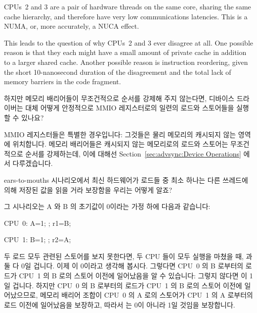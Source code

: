 \begin{enumerate}
	CPUs~2 and 3 are a pair of hardware threads on the same
	core, sharing the same cache hierarchy, and therefore have
	very low communications latencies.
	This is a NUMA, or, more accurately, a NUCA effect.

	This leads to the question of why CPUs~2 and 3 ever disagree
	at all.
	One possible reason is that they each might have a small amount
	of private cache in addition to a larger shared cache.
	Another possible reason is instruction reordering, given the
	short 10-nanosecond duration of the disagreement and the
	total lack of memory barriers in the code fragment.
	\fi

\QuickQ{}
	하지만 메모리 배리어들이 무조건적으로 순서를 강제해 주지 않는다면,
	디바이스 드라이버는 대체 어떻게 안정적으로 MMIO 레지스터로의 일련의
	로드와 스토어들을 실행할 수 있나요?

\QuickA{}
	MMIO 레지스터들은 특별한 경우입니다: 그것들은 물리 메모리의 캐시되지
	않는 영역에 위치합니다.
	메모리 배리어들은 캐시되지 않는 메모리로의 로드와 스토어는 무조건적으로
	순서를 강제하는데, 이에 대해선 Section~\ref{sec:advsync:Device
	Operations} 에서 다루겠습니다.

\QuickQ{}
	ears-to-mouths 시나리오에서 최신 하드웨어가 로드들 중 최소 하나는 다른
	쓰레드에 의해 저장된 값을 읽을 거라 보장함을 우리는 어떻게 알죠?

\QuickA{}
	그 시나리오는 A 와 B 의 초기값이 0이라는 가정 하에 다음과 같습니다:

	CPU~0: A=1; ; r1=B;

	CPU~1: B=1; ; r2=A;

	두 로드 모두 관련된 스토어를 보지 못한다면, 두 CPU 들이 모두 실행을
	마쳤을 때,  과  둘 다 0일 겁니다.
	이제  이 0이라고 생각해 봅시다.
	그렇다면 CPU~0 의 B 로부터의 로드가 CPU~1 의 B 로의 스토어 이전에
	일어났음을 알 수 있습니다: 그렇지 않다면  이 1일 겁니다.
	하지만 CPU~0 의 B 로부터의 로드가 CPU~1 의 B 로의 스토어 이전에
	일어났으므로, 메모리 배리어 조합이 CPU~0 의 A 로의 스토어가 CPU~1 의 A
	로부터의 로드 이전에 일어났음을 보장하고, 따라서  는 0이 아니라
	1일 것임을 보장합니다.


\end{enumerate}
